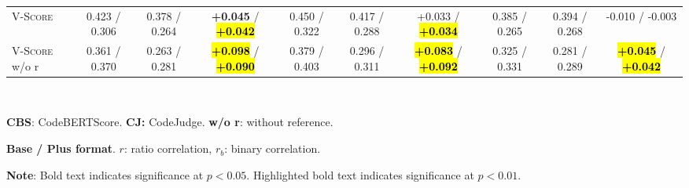\begin{table}[t]
\begin{tabular}{@{}
        l|ccc|ccc|ccc@{}}
        \midrule
        \textsc{V-Score}        & 0.423 / 0.306   & 0.378 / 0.264   & \textbf{+0.045} / \hl{\textbf{+0.042}} & 0.450 / 0.322   & 0.417 / 0.288   & +0.033 / \hl{\textbf{+0.034}}       & 0.385 / 0.265   & 0.394 / 0.268   & -0.010 / -0.003                     \\
        \textsc{V-Score} w/o r  & 0.361 / 0.370   & 0.263 / 0.281   & \hl{\textbf{+0.098}} / \hl{\textbf{+0.090}} & 0.379 / 0.403   & 0.296 / 0.311   & \hl{\textbf{+0.083}} / \hl{\textbf{+0.092}} & 0.325 / 0.331   & 0.281 / 0.289   & \hl{\textbf{+0.045}} / \hl{\textbf{+0.042}} \\
        \bottomrule
    \end{tabular}\\
    \begin{description}[itemsep=-3pt,topsep=0pt]
        \item \textbf{CBS}: CodeBERTScore. \hspace{10pt}  \textbf{CJ:} CodeJudge. \hspace{10pt} \textbf{w/o r}: without reference.
        \item \textbf{Base / Plus format}. $r$: ratio correlation, $r_b$: binary correlation.
        \item \textbf{Note}: Bold text indicates significance at $p < 0.05$. Highlighted bold text indicates significance at $p < 0.01$.
    \end{description}
\end{table}